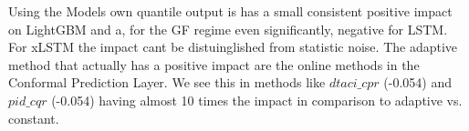 Using the Models own quantile output is has a small consistent positive impact on LightGBM and a, for the GF regime even significantly, negative for LSTM. For xLSTM the impact cant be distuinglished from statistic noise. The adaptive method that actually has a positive impact are the online methods in the Conformal Prediction Layer. We see this in methods like $dtaci\_cpr$ (-0.054) and $pid\_cqr$ (-0.054) having almost 10 times the impact in comparison to adaptive vs. constant.
%
%
